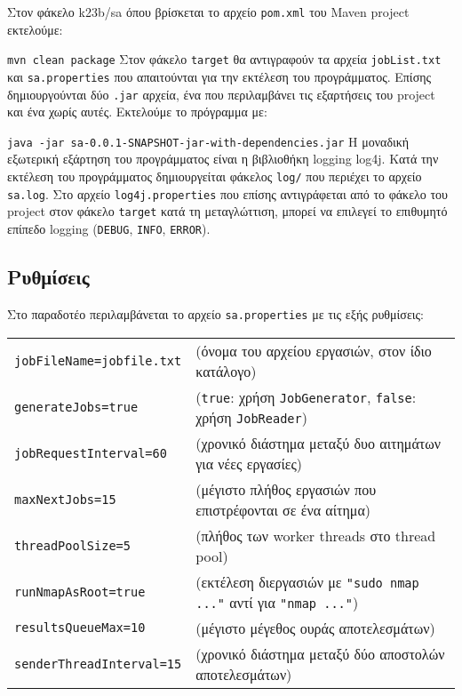 \documentclass[a4paper,11pt]{article}
\begin{document}
\begin{sloppypar}
Στον φάκελο k23b/sa όπου βρίσκεται το αρχείο \texttt{pom.xml} του Maven project εκτελούμε:

\texttt{mvn clean package}\newline
Στον φάκελο \texttt{target} θα αντιγραφούν τα αρχεία \texttt{jobList.txt} και \texttt{sa.properties} που απαιτούνται για την εκτέλεση του προγράμματος. Επίσης δημιουργούνται δύο \texttt{.jar} αρχεία, ένα που περιλαμβάνει τις εξαρτήσεις του project και ένα χωρίς αυτές. Εκτελούμε το πρόγραμμα με:

\texttt{java -jar sa-0.0.1-SNAPSHOT-jar-with-dependencies.jar}\newline
Η μοναδική εξωτερική εξάρτηση του προγράμματος είναι η βιβλιοθήκη logging log4j. Κατά την εκτέλεση του προγράμματος δημιουργείται φάκελος \texttt{log/} που περιέχει το αρχείο \texttt{sa.log}. Στο αρχείο \texttt{log4j.properties} που επίσης αντιγράφεται από το φάκελο του project στον φάκελο \texttt{target} κατά τη μεταγλώττιση, μπορεί να επιλεγεί το επιθυμητό επίπεδο logging (\texttt{DEBUG}, \texttt{INFO}, \texttt{ERROR}).

\pagebreak

\subsection{Ρυθμίσεις}

Στο παραδοτέο περιλαμβάνεται το αρχείο \texttt{sa.properties} με τις εξής ρυθμίσεις:\newline

\noindent\begin{tabular}{lp{11cm}}

\texttt{jobFileName=jobfile.txt} & (όνομα του αρχείου εργασιών, στον ίδιο κατάλογο)\\
\texttt{generateJobs=true} & (\texttt{true}: χρήση \texttt{JobGenerator}, \texttt{false}: χρήση \texttt{JobReader})\\
\texttt{jobRequestInterval=60} & (χρονικό διάστημα μεταξύ δυο αιτημάτων για νέες εργασίες)\\
\texttt{maxNextJobs=15} & (μέγιστο πλήθος εργασιών που επιστρέφονται σε ένα αίτημα)\\
\texttt{threadPoolSize=5} & (πλήθος των worker threads στο thread pool)\\
\texttt{runNmapAsRoot=true} & (εκτέλεση διεργασιών με \texttt{"sudo nmap ..."} αντί για \texttt{"nmap ..."})\\
\texttt{resultsQueueMax=10} & (μέγιστο μέγεθος ουράς αποτελεσμάτων)\\
\texttt{senderThreadInterval=15} & (χρονικό διάστημα μεταξύ δύο αποστολών αποτελεσμάτων)\\


\end{tabular}
\end{sloppypar}
\end{document}
